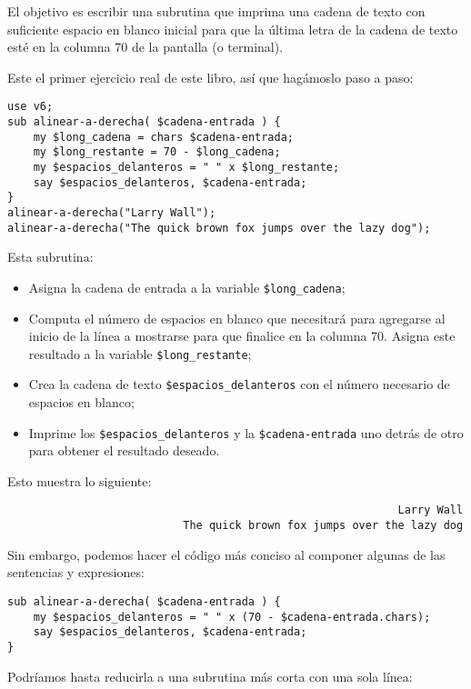 El objetivo es escribir una subrutina que imprima una cadena
de texto con suficiente espacio en blanco inicial para que 
la última letra de la cadena de texto esté en la columna 70
de la pantalla (o terminal).

Este el primer ejercicio real de este libro, así que hagámoslo paso
a paso:

\begin{verbatim}
use v6;
sub alinear-a-derecha( $cadena-entrada ) {
    my $long_cadena = chars $cadena-entrada;
    my $long_restante = 70 - $long_cadena;
    my $espacios_delanteros = " " x $long_restante;
    say $espacios_delanteros, $cadena-entrada;
}
alinear-a-derecha("Larry Wall");
alinear-a-derecha("The quick brown fox jumps over the lazy dog");
\end{verbatim}

Esta subrutina:
\begin{itemize}
\item Asigna la cadena de entrada a la variable \verb|$long_cadena|;
\item Computa el número de espacios en blanco que necesitará para
agregarse al inicio de la línea a mostrarse para que finalice 
en la columna 70. Asigna este resultado a la variable \verb|$long_restante|;
\item Crea la cadena de texto \verb|$espacios_delanteros| con el número 
necesario de espacios en blanco;
\item Imprime los \verb|$espacios_delanteros| y la \verb|$cadena-entrada|
uno detrás de otro para obtener el resultado deseado. 
\end{itemize}

Esto muestra lo siguiente:

\begin{verbatim}
                                                            Larry Wall
                           The quick brown fox jumps over the lazy dog
\end{verbatim}
Sin embargo, podemos hacer el código más conciso al componer 
algunas de las sentencias y expresiones:

\begin{verbatim}
sub alinear-a-derecha( $cadena-entrada ) {
    my $espacios_delanteros = " " x (70 - $cadena-entrada.chars);
    say $espacios_delanteros, $cadena-entrada;
}
\end{verbatim}

Podríamos hasta reducirla a una subrutina más corta con una 
sola línea:

